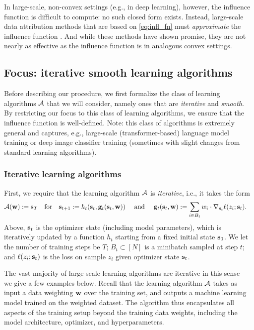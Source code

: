 In large-scale, non-convex settings (e.g., in deep learning),
however, the influence function is difficult to compute:
no such closed form exists.
Instead, large-scale data attribution methods that are based on
\eqref{eq:infl_fn}
must {\em approximate} the influence function
\citep{koh2017understanding,bae2022if,park2023trak,bae2024training}.
And while these methods have shown promise,
they are not nearly as effective as the influence function is in
analogous convex
settings.





\subsection{Focus: iterative smooth learning algorithms}
Before describing our procedure, we first formalize the class of
learning algorithms
$\mathcal{A}{}$ that we will consider, namely ones that are {\em iterative}
and {\em smooth}.
By restricting our focus to this class
of learning algorithms, we ensure that the influence function is well-defined.
Note: this class of algorithms is extremely general and captures,
e.g., large-scale (transformer-based) language model training or deep image
classifier training (sometimes with slight changes from standard
learning algorithms).

\subsubsection{Iterative learning algorithms}
First, we require that the learning algorithm $\mathcal{A}{}$
is {\em iterative}, i.e., it takes the form
\begin{align}
  \label{eq:iterative_algo}
  \mathcal{A}(\mathbf{w}) := \mathbf{s}_{T} \quad \text{for} \quad
  \mathbf{s}_{t+1} &:= h_t(\mathbf{s}_{t}, \mathbf{g}_t(\mathbf{s}_{t}, \mathbf{w}))
  \quad \text{ and } \quad \mathbf{g}_t(\mathbf{s}_{t}, \mathbf{w}) :=
  \sum_{i\in B_t} w_i \cdot \nabla_{\mathbf{s}_{t}} \ell(z_i; \mathbf{s}_{t}).
\end{align}
Above,
$\mathbf{s}_{t}$ is the optimizer state (including model parameters),
which is iteratively updated by a function $h_t$
starting from a fixed initial state $\mathbf{s}_{0}$.
We let the number of training steps be $T$;
$B_t \subset [N]$ is a minibatch sampled at step $t$;
and $\ell(z_i; \mathbf{s}_{t})$ is the loss on
sample $z_i$ given optimizer state $\mathbf{s}_{t}$.

The vast majority of large-scale learning algorithms are iterative
in this sense---we give a few examples below.
Recall that the learning algorithm $\mathcal{A}{}$ takes as input a
data weighting $\mathbf{w}$ over the training set, and outputs
a machine learning model trained on the weighted dataset.
The algorithm thus encapsulates all aspects of the training setup
beyond the training data weights, including the model architecture,
optimizer, and hyperparameters.

